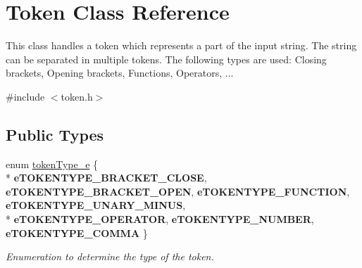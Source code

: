 \hypertarget{class_token}{}\section{Token Class Reference}
\label{class_token}


This class handles a token which represents a part of the input string. The string can be separated in multiple tokens. The following types are used\+: Closing brackets, Opening brackets, Functions, Operators, ...  




{\ttfamily \#include $<$token.\+h$>$}

\subsection*{Public Types}
\begin{DoxyCompactItemize}
\item 
\hypertarget{class_token_a706d105bff3282a406a9b218fcee1bfc}{}enum \hyperlink{class_token_a706d105bff3282a406a9b218fcee1bfc}{token\+Type\+\_\+e} \{ \\*
{\bfseries e\+T\+O\+K\+E\+N\+T\+Y\+P\+E\+\_\+\+B\+R\+A\+C\+K\+E\+T\+\_\+\+C\+L\+O\+S\+E}, 
{\bfseries e\+T\+O\+K\+E\+N\+T\+Y\+P\+E\+\_\+\+B\+R\+A\+C\+K\+E\+T\+\_\+\+O\+P\+E\+N}, 
{\bfseries e\+T\+O\+K\+E\+N\+T\+Y\+P\+E\+\_\+\+F\+U\+N\+C\+T\+I\+O\+N}, 
{\bfseries e\+T\+O\+K\+E\+N\+T\+Y\+P\+E\+\_\+\+U\+N\+A\+R\+Y\+\_\+\+M\+I\+N\+U\+S}, 
\\*
{\bfseries e\+T\+O\+K\+E\+N\+T\+Y\+P\+E\+\_\+\+O\+P\+E\+R\+A\+T\+O\+R}, 
{\bfseries e\+T\+O\+K\+E\+N\+T\+Y\+P\+E\+\_\+\+N\+U\+M\+B\+E\+R}, 
{\bfseries e\+T\+O\+K\+E\+N\+T\+Y\+P\+E\+\_\+\+C\+O\+M\+M\+A}
 \}\label{class_token_a706d105bff3282a406a9b218fcee1bfc}

\begin{DoxyCompactList}\small\item\em Enumeration to determine the type of the token. \end{DoxyCompactList}\end{DoxyCompactItemize}
